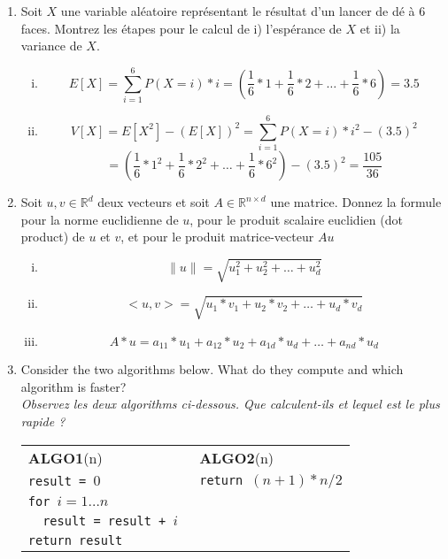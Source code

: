 \begin{enumerate}

\item {}
%
{Soit $X$ une variable aléatoire représentant le résultat d'un lancer de dé à 6 faces. Montrez les étapes pour le calcul de 
i) l'espérance de $X$ et
ii) la variance de $X$.}

\begin{enumerate}[i)]
    \item $$E[X] = \sum_{i=1}^{6}P(X=i)*i = \left(\frac{1}{6}*1 + \frac{1}{6}*2 + \ldots + \frac{1}{6}*6\right) = 3.5$$
    \item $$V[X] = E[X^2] - (E[X])^2 = \sum_{i=1}^{6}P(X=i)*i^2 - (3.5)^2$$ $$ = \left(\frac{1}{6}*1^2 + \frac{1}{6}*2^2 + \ldots + \frac{1}{6}*6^2\right) - (3.5)^2 = {\frac{105}{36}}$$
\end{enumerate}

\item {}
%
{Soit $u,v\in \mathbb{R}^d$ deux vecteurs et soit $A\in\mathbb{R}^{n\times d}$ une matrice. Donnez la formule pour la norme euclidienne de $u$, pour le produit scalaire euclidien (dot product) de $u$ et $v$, et pour le produit matrice-vecteur $Au$}

\begin{enumerate}[i)]
    \item $$\| u\| = \sqrt{u_1^2 + u_2^2 + \ldots + u_d^2} $$
    \item $$<u, v> = \sqrt{u_1*v_1 + u_2*v_2 + \ldots + u_d*v_d} $$
    \item $$A*u = a_{11}*u_1 + a_{12}*u_2 + a_{1d}*u_d + \ldots + a_{nd}*u_d$$
\end{enumerate}

\item {}
Consider the two algorithms below. What do they compute and which algorithm is faster? \\
\textit{Observez les deux algorithms ci-dessous. Que calculent-ils et lequel est le plus rapide ?}

\begin{tabular}{ll}
\textbf{ALGO1}(n) \hspace{4cm} & \textbf{ALGO2}(n) \\
\texttt{result = $0$}     &  \texttt{return $(n+1)*n/2$}  \\ 
\texttt{for $i=1\dots n$} & \\
\texttt{\ \ result = result + $i$  } & \\
\texttt{return result} &
\end{tabular}


\end{enumerate}
